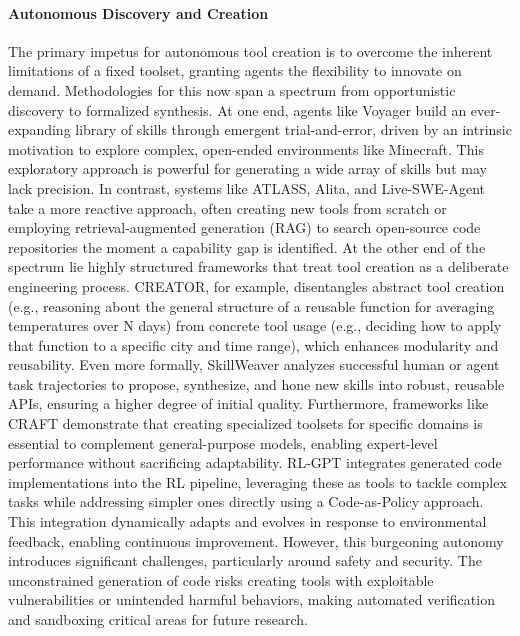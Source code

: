 \documentclass[10pt]{article} %
\begin{document}
\paragraph{Autonomous Discovery and Creation}
The primary impetus for autonomous tool creation is to overcome the inherent limitations of a fixed toolset, granting agents the flexibility to innovate on demand. Methodologies for this now span a spectrum from opportunistic discovery to formalized synthesis. At one end, agents like Voyager build an ever-expanding library of skills through emergent trial-and-error, driven by an intrinsic motivation to explore complex, open-ended environments like Minecraft\citep{wang2023voyager}. This exploratory approach is powerful for generating a wide array of skills but may lack precision. In contrast, systems like ATLASS, Alita, and Live-SWE-Agent take a more reactive approach, often creating new tools from scratch or employing retrieval-augmented generation (RAG) to search open-source code repositories the moment a capability gap is identified\citep{Haque2025ATLASS, qiu2025alita, qiu2025alitag, xia2025livesweagent}.
At the other end of the spectrum lie highly structured frameworks that treat tool creation as a deliberate engineering process. CREATOR, for example, disentangles abstract tool creation (e.g., reasoning about the general structure of a reusable function for averaging temperatures over N days) from concrete tool usage (e.g., deciding how to apply that function to a specific city and time range), which enhances modularity and reusability\citep{qian2023creator}. Even more formally, SkillWeaver analyzes successful human or agent task trajectories to propose, synthesize, and hone new skills into robust, reusable APIs, ensuring a higher degree of initial quality\citep{zheng2025skillweaver}. Furthermore, frameworks like CRAFT demonstrate that creating specialized toolsets for specific domains is essential to complement general-purpose models, enabling expert-level performance without sacrificing adaptability\citep{yuan2024craft}. RL-GPT\citep{liu2024rl} integrates generated code implementations into the RL pipeline, leveraging these as tools to tackle complex tasks while addressing simpler ones directly using a Code-as-Policy approach. This integration dynamically adapts and evolves in response to environmental feedback, enabling continuous improvement. However, this burgeoning autonomy introduces significant challenges, particularly around safety and security. The unconstrained generation of code risks creating tools with exploitable vulnerabilities or unintended harmful behaviors, making automated verification and sandboxing critical areas for future research.
\end{document}
